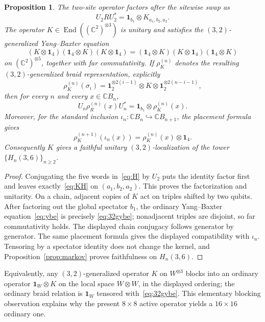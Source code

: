 \documentclass[11pt]{article}
\newtheorem{proposition}[theorem]{Proposition}
\theoremstyle{remark}
\newcommand{\Id}{\mathbf 1}
\newcommand{\End}{\operatorname{End}}
\newcommand{\bbC}{\mathbb C}
\begin{document}
\begin{proposition}\label{prop:gybe}
The two-site operator factors after the sitewise swap as
\[
  U_2RU_2^*
  =
  \Id_{b_1}\otimes K_{a_1,b_2,a_2}.
\]
The operator \(K\in\End((\bbC^2)^{\otimes3})\) is unitary and satisfies the
\((3,2)\)-generalized Yang--Baxter equation
\begin{equation}
  (K\otimes\Id_4)(\Id_4\otimes K)(K\otimes\Id_4)
  =
  (\Id_4\otimes K)(K\otimes\Id_4)(\Id_4\otimes K)
  \label{eq:32gybe}
\end{equation}
on \((\bbC^2)^{\otimes5}\), together with far commutativity.  If
\(\rho_K^{(n)}\) denotes the resulting \((3,2)\)-generalized braid
representation, explicitly
\[
  \rho_K^{(n)}(\sigma_i)
  =
  \Id_2^{\otimes2(i-1)}\otimes K
  \otimes\Id_2^{\otimes2(n-i-1)},
\]
then for every \(n\) and every \(x\in\bbC B_n\),
\[
  U_n\rho_R^{(n)}(x)U_n^*
  =
  \Id_{b_1}\otimes\rho_K^{(n)}(x).
\]
Moreover, for the standard inclusion \(\iota_n:\bbC B_n\hookrightarrow
\bbC B_{n+1}\), the placement formula gives
\[
  \rho_K^{(n+1)}(\iota_n(x))
  =\rho_K^{(n)}(x)\otimes\Id_4.
\]
Consequently \(K\) gives a faithful unitary \((3,2)\)-localization of the
tower \(\{H_n(3,6)\}_{n\ge2}\).
\end{proposition}

\begin{proof}
Conjugating the five words in~\eqref{eq:H} by \(U_2\) puts the identity
factor first and leaves exactly~\eqref{eq:KH} on
\((a_1,b_2,a_2)\).  This proves the factorization and unitarity.
On a chain, adjacent copies of \(K\) act on triples shifted by two qubits.
After factoring out the global spectator \(b_1\), the ordinary
Yang--Baxter equation~\eqref{eq:ybe} is precisely
\eqref{eq:32gybe}; nonadjacent triples are disjoint, so far commutativity
holds.  The displayed chain conjugacy follows generator by generator.
The same placement formula gives the displayed compatibility with
\(\iota_n\).
Tensoring by a spectator identity does not change the kernel, and
Proposition~\ref{prop:markov} proves faithfulness on \(H_n(3,6)\).
\end{proof}

Equivalently, any \((3,2)\)-generalized operator \(K\) on \(W^{\otimes3}\)
blocks into an ordinary operator \(\Id_W\otimes K\) on the local space
\(W\otimes W\), in the displayed ordering; the ordinary braid relation is
\(\Id_W\) tensored with~\eqref{eq:32gybe}.  This elementary blocking
observation explains why the present \(8\times8\) active operator yields a
\(16\times16\) ordinary one.
\end{document}
